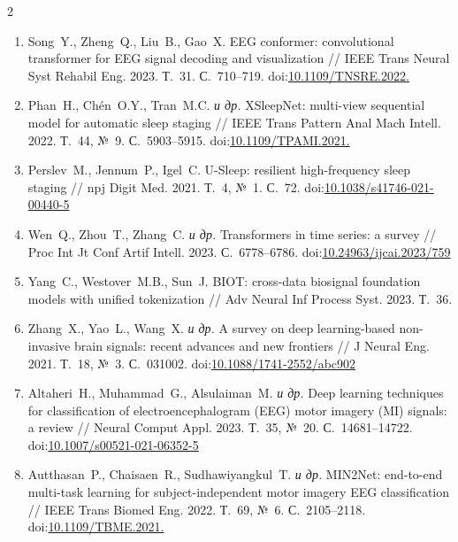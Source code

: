 \documentclass[14pt,a4paper]{extarticle}
\begin{document}
\begin{multicols}{2}
\begin{otherlanguage}{russian}
\begin{enumerate}[leftmargin=*,label={\arabic*.},itemsep=3pt,topsep=4pt]
\item Song~Y., Zheng~Q., Liu~B., Gao~X.
EEG conformer: convolutional transformer for EEG signal decoding and visualization
// IEEE Trans Neural Syst Rehabil Eng. 2023. Т.~31. С.~710--719.
doi:\href{https://doi.org/10.1109/TNSRE.2022.3230250}{10.1109/\allowbreak TNSRE.2022.}

\item Phan~H., Ch\'en~O.Y., Tran~M.C. \textit{и др.}
XSleepNet: multi-view sequential model for automatic sleep staging
// IEEE Trans Pattern Anal Mach Intell. 2022. Т.~44, №~9. С.~5903--5915.
doi:\href{https://doi.org/10.1109/TPAMI.2021.3070057}{10.1109/\allowbreak TPAMI.2021.}

\item Perslev~M., Jennum~P., Igel~C.
U-Sleep: resilient high-frequency sleep staging
// npj Digit Med. 2021. Т.~4, №~1. С.~72.
doi:\href{https://doi.org/10.1038/s41746-021-00440-5}{10.1038/s41746-021-00440-5}

\item Wen~Q., Zhou~T., Zhang~C. \textit{и др.}
Transformers in time series: a survey
// Proc Int Jt Conf Artif Intell. 2023. С.~6778--6786.
doi:\href{https://doi.org/10.24963/ijcai.2023/759}{10.24963/ijcai.2023/759}

\item Yang~C., Westover~M.B., Sun~J.
BIOT: cross-data biosignal foundation models with unified tokenization
// Adv Neural Inf Process Syst. 2023. Т.~36.

\item Zhang~X., Yao~L., Wang~X. \textit{и др.}
A survey on deep learning-based non-invasive brain signals: recent advances and new frontiers
// J Neural Eng. 2021. Т.~18, №~3. С.~031002.
doi:\href{https://doi.org/10.1088/1741-2552/abc902}{10.1088/1741-2552/abc902}

\item Altaheri~H., Muhammad~G., Alsulaiman~M. \textit{и др.}
Deep learning techniques for classification of electroencephalogram (EEG) motor imagery (MI) signals: a review
// Neural Comput Appl. 2023. Т.~35, №~20. С.~14681--14722.
doi:\href{https://doi.org/10.1007/s00521-021-06352-5}{10.1007/s00521-021-06352-5}

\item Autthasan~P., Chaisaen~R., Sudhawiyangkul~T. \textit{и др.}
MIN2Net: end-to-end multi-task learning for subject-independent motor imagery EEG classification
// IEEE Trans Biomed Eng. 2022. Т.~69, №~6. С.~2105--2118.
doi:\href{https://doi.org/10.1109/TBME.2021.3137184}{10.1109/\allowbreak TBME.2021.}


\end{enumerate}
\end{otherlanguage}
\end{multicols}
\end{document}
